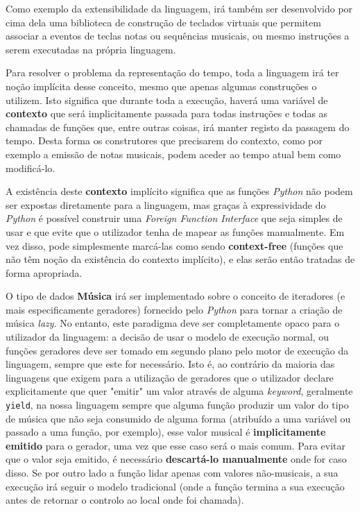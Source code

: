 Como exemplo da extensibilidade da linguagem, irá também ser desenvolvido por cima dela uma biblioteca de construção de teclados virtuais que permitem associar a eventos de teclas notas ou sequências musicais, ou mesmo instruções a serem executadas na própria linguagem.

Para resolver o problema da representação do tempo, toda a linguagem irá ter noção implícita desse conceito, mesmo que apenas algumas construções o utilizem. Isto significa que durante toda a execução, haverá uma variável de \textbf{contexto} que será implicitamente passada para todas instruções e todas as chamadas de funções que, entre outras coisas, irá manter registo da passagem do tempo. Desta forma os construtores que precisarem do contexto, como por exemplo a emissão de notas musicais, podem aceder ao tempo atual bem como modificá-lo.

A existência deste \textbf{contexto} implícito significa que as funções \textit{Python} não podem ser expostas diretamente para a linguagem, mas graças à expressividade do \textit{Python} é possível construir uma \textit{Foreign Function Interface} que seja simples de usar e que evite que o utilizador tenha de mapear as funções manualmente. Em vez disso, pode simplesmente marcá-las como sendo \textbf{context-free} (funções que não têm noção da existência do contexto implícito), e elas serão então tratadas de forma apropriada.

O tipo de dados \textbf{Música} irá ser implementado sobre o conceito de iteradores (e mais especificamente geradores) fornecido pelo \textit{Python} para tornar a criação de música \textit{lazy}. No entanto, este paradigma deve ser completamente opaco para o utilizador da linguagem: a decisão de usar o modelo de execução normal, ou funções geradores deve ser tomado em segundo plano pelo motor de execução da linguagem, sempre que este for necessário. Isto é, ao contrário da maioria das linguagens que exigem para a utilização de geradores que o utilizador declare explicitamente que quer "emitir" um valor através de alguma \textit{keyword}, geralmente \texttt{yield}, na nossa linguagem sempre que alguma função produzir um valor do tipo de música que não seja consumido de alguma forma (atribuído a uma variável ou passado a uma função, por exemplo), esse valor musical é \textbf{implicitamente emitido} para o gerador, uma vez que esse caso será o mais comum. Para evitar que o valor seja emitido, é necessário \textbf{descartá-lo manualmente} onde for caso disso. Se por outro lado a função lidar apenas com valores não-musicais, a sua execução irá seguir o modelo tradicional (onde a função termina a sua execução antes de retornar o controlo ao local onde foi chamada).

